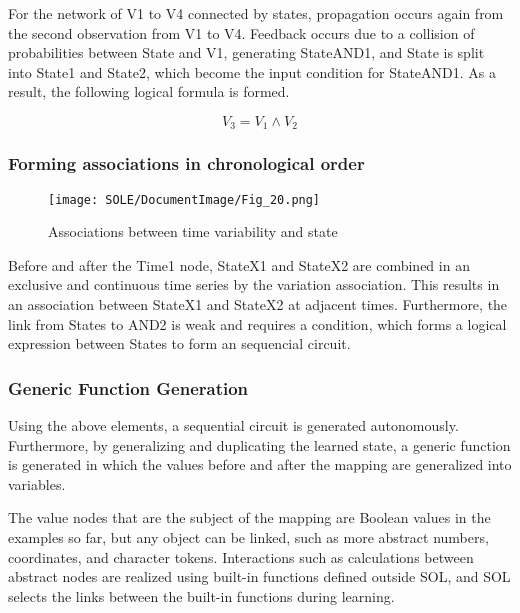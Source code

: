 \documentclass[12pt]{article}
\begin{document}
For the network of V1 to V4 connected by states, propagation occurs
again from the second observation from V1 to V4. Feedback occurs due to
a collision of probabilities between State and V1, generating StateAND1,
and State is split into State1 and State2, which become the input
condition for StateAND1. As a result, the following logical formula is
formed.

\[ V_3=V_1 \land V_2\]

\subsubsection{Forming associations in chronological
order}\label{forming-associations-in-chronological-order}

\begin{figure}[ht]
  \centering
  \texttt{[image: SOLE/DocumentImage/Fig\_20.png]}
  \caption{Associations between time variability and state}
  \label{fig:associations_between_time_variability_and_state}
\end{figure}

Before and after the Time1 node, StateX1 and StateX2 are combined in an
exclusive and continuous time series by the variation association. This
results in an association between StateX1 and StateX2 at adjacent times.
Furthermore, the link from States to AND2 is weak and requires a
condition, which forms a logical expression between States to form an
sequencial circuit.

\subsubsection{Generic Function
Generation}\label{generic-function-generation}

Using the above elements, a sequential circuit is generated
autonomously. Furthermore, by generalizing and duplicating the learned
state, a generic function is generated in which the values
\hspace{0pt}\hspace{0pt}before and after the mapping are generalized
into variables.

The value nodes that are the subject of the mapping are Boolean values
\hspace{0pt}\hspace{0pt}in the examples so far, but any object can be
linked, such as more abstract numbers, coordinates, and character
tokens. Interactions such as calculations between abstract nodes are
realized using built-in functions defined outside SOL, and SOL selects
the links between the built-in functions during learning.
\end{document}
